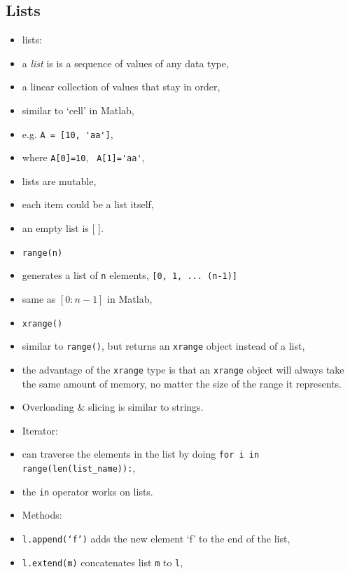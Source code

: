 \documentclass[onecolumn]{IEEEtran} %
\begin{document}
\subsection{Lists}
\begin{itemize}
    \item lists:
    \bi
        \item a \emph{list} is is a sequence of values of any data type,
        \bi
            \item a linear collection of values that stay in order,
            \item similar to ‘cell’ in Matlab,
        \ei
        \item e.g. \verb|A = [10, 'aa']|,
        \bi
            \item where \verb|A[0]=10|, \verb| A[1]='aa'|,
        \ei
        \item lists are mutable,
        \item each item could be a list itself,
        \item an empty list is [ ].
    \ei
    \item \verb|range(n)|
    \bi
        \item generates a list of \verb|n| elements, \newline
        \verb|[0, 1, ... (n-1)]|
        \item same as $[0:n-1]$ in Matlab,
    \ei
    \item \verb|xrange()|
    \bi
        \item similar to \verb|range()|, but returns an \verb|xrange| object instead of a list,
        \item the advantage of the \verb|xrange| type is that an \verb|xrange| object will always take the same amount of memory, no matter the size of the range it represents.
    \ei
    \item Overloading \& slicing is similar to strings.
    \item Iterator:
    \bi
        \item can traverse the elements in the list by doing \newline
         \verb|for i in range(len(list_name)):|,
        \item the  \verb|in| operator works on lists.
    \ei
    \item Methods:
    \bi
        \item \verb|l.append(‘f’)| adds the new element ‘f’ to the end of the list,
        \item \verb|l.extend(m)| concatenates list \verb|m| to \verb|l|,

\end{itemize}
\end{document}
